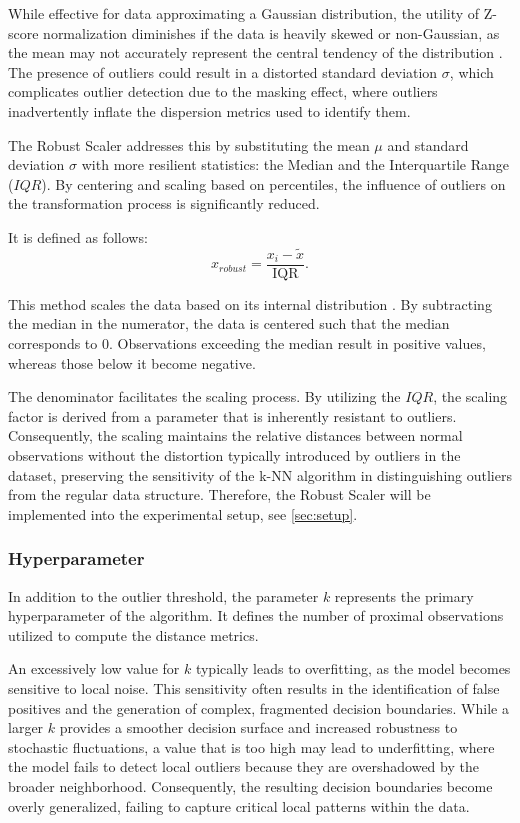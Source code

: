 While effective for data approximating a Gaussian distribution, the utility of Z-score normalization diminishes if the data is heavily skewed or non-Gaussian, as the mean may not accurately represent the central tendency of the distribution .
The presence of outliers could result in a distorted standard deviation $\sigma$, which complicates outlier detection due to the masking effect, where outliers inadvertently inflate the dispersion metrics used to identify them.


The Robust Scaler addresses this by substituting the mean $\mu$ and standard deviation $\sigma$ with more resilient statistics: the Median and the Interquartile Range ($IQR$). 
By centering and scaling based on percentiles, the influence of outliers on the transformation process is significantly reduced.


It is defined as follows:
\begin{equation}
    x_{robust} = \frac{x_i - \tilde{x}}{\text{IQR}}.
\end{equation}


This method scales the data based on its internal distribution \citep[p. 4]{izonin2022two}. 
By subtracting the median in the numerator, the data is centered such that the median corresponds to 0. 
Observations exceeding the median result in positive values, whereas those below it become negative.


The denominator facilitates the scaling process. 
By utilizing the $IQR$, the scaling factor is derived from a parameter that is inherently resistant to outliers. 
Consequently, the scaling maintains the relative distances between normal observations without the distortion typically introduced by outliers in the dataset, preserving the sensitivity of the k-NN algorithm in distinguishing outliers from the regular data structure.
Therefore, the Robust Scaler will be implemented into the experimental setup, see \ref{sec:setup}.


\subsubsection*{Hyperparameter}
In addition to the outlier threshold, the parameter $k$ represents the primary hyperparameter of the algorithm. 
It defines the number of proximal observations utilized to compute the distance metrics.


An excessively low value for $k$ typically leads to overfitting, as the model becomes sensitive to local noise. 
This sensitivity often results in the identification of false positives and the generation of complex, fragmented decision boundaries. 
While a larger $k$ provides a smoother decision surface and increased robustness to stochastic fluctuations, a value that is too high may lead to underfitting, where the model fails to detect local outliers because they are overshadowed by the broader neighborhood.
Consequently, the resulting decision boundaries become overly generalized, failing to capture critical local patterns within the data.


